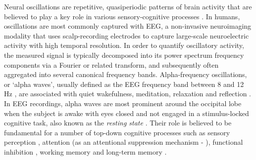 \documentclass[12pt,twoside]{article}
\begin{document}
\vspace{-0.5cm}
Neural oscillations are repetitive, quasiperiodic patterns of brain activity that are believed to play a key role in various sensory-cognitive processes \citep{pmid24174901}. In humans, oscillations are most commonly captured with EEG, a non-invasive neuroimaging modality that uses scalp-recording electrodes to capture large-scale neuroelectric activity with high temporal resolution. 
In order to quantify oscillatory activity, the measured signal is typically decomposed into its power spectrum frequency components via a Fourier or related transform, and subsequently often aggregated into several canonical frequency bands. %
Alpha-frequency oscillations, or `alpha waves', usually defined as the EEG frequency band between 8 and 12 Hz \citep{MOINI2020177}, are associated with quiet wakefulness, meditation, relaxation and reflection \citep{halgren2019generation}. In EEG recordings, alpha waves are most prominent around the occipital lobe when the subject is awake with eyes closed and not engaged in a stimulus-locked cognitive task, also known as the \textit{resting state} \citep{klimesch1999eeg}. Their role is believed to be fundamental for a number of top-down cognitive processes \citep{halgren2019generation} such as sensory perception \citep{samaha2015speed}, attention (as an attentional suppression mechanism -  \citealt{foxe2011role}), functional inhibition \citep{jensen2010shaping}, working memory \citep{wianda2019roles} and long-term memory \citep{klimesch2012alpha}.
\end{document}
